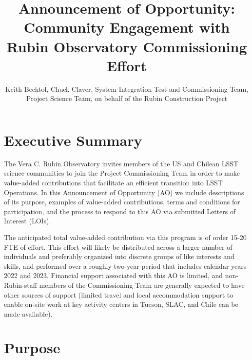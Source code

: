 \documentclass[SE,authoryear,toc]{lsstdoc}
\title{Announcement of Opportunity: Community Engagement with Rubin Observatory Commissioning Effort}
\author{%
Keith Bechtol, Chuck Claver, System Integration Test and Commissioning Team, Project Science Team, on behalf of the Rubin Construction Project
}
\date{\vcsDate}
\begin{document}
\maketitle


\section{Executive Summary}

The Vera C. Rubin Observatory invites members of the US and Chilean LSST science communities to join the Project Commissioning Team in order to make value-added contributions that facilitate an efficient transition into LSST Operations. In this Announcement of Opportunity (AO) we include descriptions of its purpose, examples of value-added contributions, terms and conditions for participation, and the process to respond to this AO via submitted Letters of Interest (LOIs).

The anticipated total value-added contribution via this program is of order 15-20 FTE of effort. This effort will likely be distributed across a larger number of individuals and preferably organized into discrete groups of like interests and skills, and performed over a roughly two-year period that includes calendar years 2022 and 2023. Financial support associated with this AO is limited, and non-Rubin-staff members of the Commissioning Team are generally expected to have other sources of support (limited travel and local accommodation support to enable on-site work at key activity centers in Tucson, SLAC, and Chile can be made available).

\section{Purpose}
\label{purpose}
\end{document}
